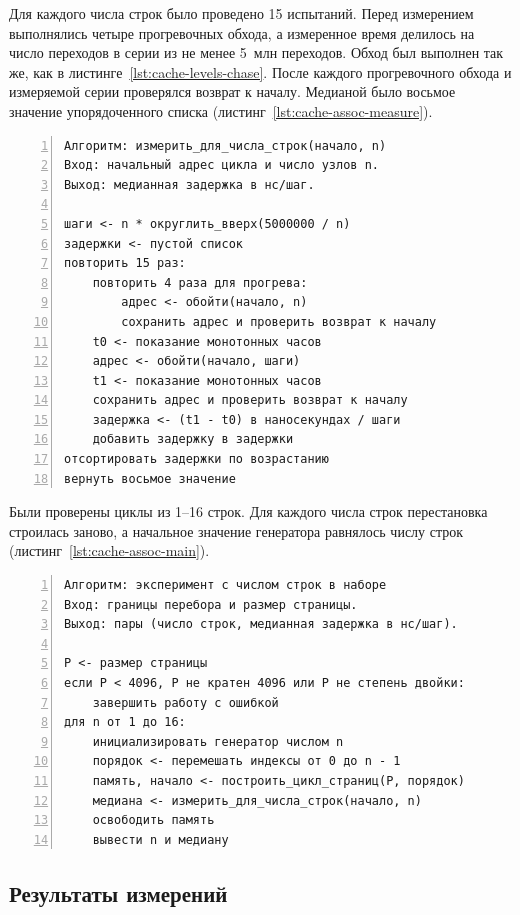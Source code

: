 Для каждого числа строк было проведено 15 испытаний. Перед измерением выполнялись четыре прогревочных обхода, а измеренное время делилось на число переходов в серии из не менее 5~млн переходов. Обход был выполнен так же, как в листинге~\ref{lst:cache-levels-chase}. После каждого прогревочного обхода и измеряемой серии проверялся возврат к началу. Медианой было восьмое значение упорядоченного списка (листинг~\ref{lst:cache-assoc-measure}).

\begin{Verbatim}[frame=single,numbers=left,fontsize=\small,breaklines=true]
Алгоритм: измерить_для_числа_строк(начало, n)
Вход: начальный адрес цикла и число узлов n.
Выход: медианная задержка в нс/шаг.

шаги <- n * округлить_вверх(5000000 / n)
задержки <- пустой список
повторить 15 раз:
    повторить 4 раза для прогрева:
        адрес <- обойти(начало, n)
        сохранить адрес и проверить возврат к началу
    t0 <- показание монотонных часов
    адрес <- обойти(начало, шаги)
    t1 <- показание монотонных часов
    сохранить адрес и проверить возврат к началу
    задержка <- (t1 - t0) в наносекундах / шаги
    добавить задержку в задержки
отсортировать задержки по возрастанию
вернуть восьмое значение
\end{Verbatim}

Были проверены циклы из 1--16 строк. Для каждого числа строк перестановка строилась заново, а начальное значение генератора равнялось числу строк (листинг~\ref{lst:cache-assoc-main}).

\begin{Verbatim}[frame=single,numbers=left,fontsize=\small,breaklines=true]
Алгоритм: эксперимент с числом строк в наборе
Вход: границы перебора и размер страницы.
Выход: пары (число строк, медианная задержка в нс/шаг).

P <- размер страницы
если P < 4096, P не кратен 4096 или P не степень двойки:
    завершить работу с ошибкой
для n от 1 до 16:
    инициализировать генератор числом n
    порядок <- перемешать индексы от 0 до n - 1
    память, начало <- построить_цикл_страниц(P, порядок)
    медиана <- измерить_для_числа_строк(начало, n)
    освободить память
    вывести n и медиану
\end{Verbatim}

\subsection{Результаты измерений}

